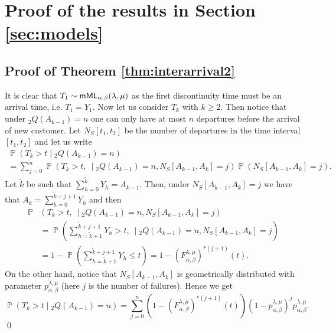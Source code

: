 \documentclass[]{amsart}
\numberwithin{equation}{section}
\theoremstyle{remark}
\theoremstyle{definition}
\DeclareMathOperator{\bP}{\mathbb{P}}
\begin{document}
\section{Proof of the results in Section \ref{sec:models}}\label{app:B}
\subsection{Proof of Theorem \ref{thm:interarrival2}}\label{sec:ptinter12}
It is clear that $T_1 \sim {\sf mML}_{\alpha,\beta}(\lambda,\mu)$ as the first discontinuity time must be an arrival time, i.e. $T_1=Y_1$. Now let us consider $T_k$ with $k \ge 2$. Then notice that under ${}_2Q(A_{k-1})=n$ one can only have at most $n$ departures before the arrival of new customer. Let $N_S[t_1,t_2]$ be the number of departures in the time interval $[t_1,t_2]$ and let us write
	\begin{multline*}
		\bP(T_k>t \mid {}_2Q(A_{k-1})=n)\\
		=\sum_{j=0}^{n}\bP(T_k>t, \ \mid {}_2Q(A_{k-1})=n, N_S[A_{k-1},A_k]=j)\bP(N_S[A_{k-1},A_k]=j).
	\end{multline*}
	Let $\widetilde{k}$ be such that $\sum_{h=0}^{\widetilde{k}}Y_{h}=A_{k-1}$. Then, under $N_S[A_{k-1},A_k]=j$ we have that $A_k=\sum_{h=0}^{\widetilde{k}+j+1}Y_{h}$ and then
	\begin{align*}
		\bP&(T_k>t, \ \mid {}_2Q(A_{k-1})=n, N_S[A_{k-1},A_k]=j)\\
		&=\bP\left(\sum_{h=\widetilde{k}+1}^{\widetilde{k}+j+1}Y_{h}>t, \ \mid {}_2Q(A_{k-1})=n, N_S[A_{k-1},A_k]=j\right)\\
		&=1-\bP\left(\sum_{h=\widetilde{k}+1}^{\widetilde{k}+j+1}Y_{h} \le t\right)=1-(F_{\alpha,\beta}^{\lambda,\mu})^{\ast (j+1)}(t).
	\end{align*}
	On the other hand, notice that $N_S[A_{k-1},A_k]$ is geometrically distributed with parameter $p_{\alpha,\beta}^{\lambda,\mu}$ (here $j$ is the number of failures).
	Hence we get
	\begin{equation*}
		\bP(T_k>t \mid {}_2Q(A_{k-1})=n)
		=\sum_{j=0}^{n}(1-(F_{\alpha,\beta}^{\lambda,\mu})^{\ast (j+1)}(t))(1-p_{\alpha,\beta}^{\lambda,\mu})^jp_{\alpha,\beta}^{\lambda,\mu}.
	\end{equation*}
\hfill \qed
\end{document}
